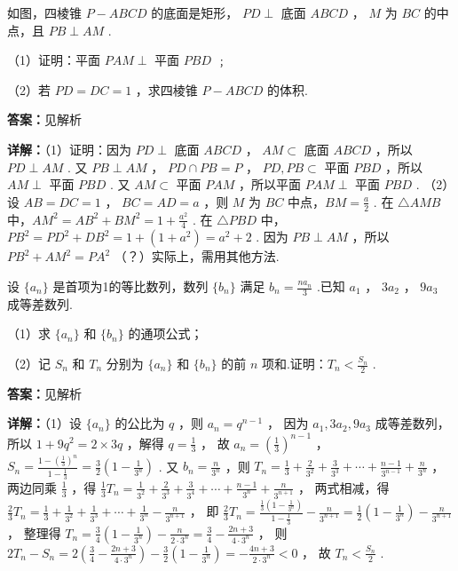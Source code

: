 \begin{question}[points=12]
如图，四棱锥 $P-ABCD$ 的底面是矩形， $PD \perp$ 底面 $ABCD$ ， $M$ 为 $BC$ 的中点，且 $PB \perp AM$ .

（1）证明：平面 $PAM \perp$ 平面 $PBD$ ﹔

（2）若 $PD = DC = 1$ ，求四棱锥 $P-ABCD$ 的体积.
\begin{solution}
\textbf{答案：}见解析

\textbf{详解：}（1）证明：因为 $PD \perp$ 底面 $ABCD$ ， $AM \subset$ 底面 $ABCD$ ，所以 $PD \perp AM$ .
又 $PB \perp AM$ ， $PD \cap PB = P$ ， $PD, PB \subset$ 平面 $PBD$ ，所以 $AM \perp$ 平面 $PBD$ .
又 $AM \subset$ 平面 $PAM$ ，所以平面 $PAM \perp$ 平面 $PBD$ .
（2）设 $AB = DC = 1$ ， $BC = AD = a$ ，则 $M$ 为 $BC$ 中点，$BM = \frac{a}{2}$ .
在 $\triangle AMB$ 中，$AM^2 = AB^2 + BM^2 = 1 + \frac{a^2}{4}$ .
在 $\triangle PBD$ 中，$PB^2 = PD^2 + DB^2 = 1 + (1+a^2) = a^2+2$ .
因为 $PB \perp AM$ ，所以 $PB^2 + AM^2 = PA^2$ （？）实际上，需用其他方法.
\end{solution}
\end{question}

\begin{question}[points=12]
设 $\{a_n\}$ 是首项为1的等比数列，数列 $\{b_n\}$ 满足 $b_n = \frac{na_n}{3}$ .已知 $a_1$ ， $3a_2$ ， $9a_3$ 成等差数列.

（1）求 $\{a_n\}$ 和 $\{b_n\}$ 的通项公式；

（2）记 $S_n$ 和 $T_n$ 分别为 $\{a_n\}$ 和 $\{b_n\}$ 的前 $n$ 项和.证明：$T_n < \frac{S_n}{2}$ .
\begin{solution}
\textbf{答案：}见解析

\textbf{详解：}（1）设 $\{a_n\}$ 的公比为 $q$ ，则 $a_n = q^{n-1}$ ，
因为 $a_1, 3a_2, 9a_3$ 成等差数列，所以 $1 + 9q^2 = 2\times 3q$ ，解得 $q = \frac{1}{3}$ ，
故 $a_n = \left(\frac{1}{3}\right)^{n-1}$ ， $S_n = \frac{1-\left(\frac{1}{3}\right)^n}{1-\frac{1}{3}} = \frac{3}{2}\left(1-\frac{1}{3^n}\right)$ .
又 $b_n = \frac{n}{3^n}$ ，则 $T_n = \frac{1}{3} + \frac{2}{3^2} + \frac{3}{3^3} + \cdots + \frac{n-1}{3^{n-1}} + \frac{n}{3^n}$ ，
两边同乘 $\frac{1}{3}$ ，得 $\frac{1}{3}T_n = \frac{1}{3^2} + \frac{2}{3^3} + \frac{3}{3^4} + \cdots + \frac{n-1}{3^n} + \frac{n}{3^{n+1}}$ ，
两式相减，得 $\frac{2}{3}T_n = \frac{1}{3} + \frac{1}{3^2} + \frac{1}{3^3} + \cdots + \frac{1}{3^n} - \frac{n}{3^{n+1}}$ ，
即 $\frac{2}{3}T_n = \frac{\frac{1}{3}(1-\frac{1}{3^n})}{1-\frac{1}{3}} - \frac{n}{3^{n+1}} = \frac{1}{2}(1-\frac{1}{3^n}) - \frac{n}{3^{n+1}}$ ，
整理得 $T_n = \frac{3}{4}(1-\frac{1}{3^n}) - \frac{n}{2\cdot3^n} = \frac{3}{4} - \frac{2n+3}{4\cdot3^n}$ ，
则 $2T_n - S_n = 2\left(\frac{3}{4} - \frac{2n+3}{4\cdot3^n}\right) - \frac{3}{2}\left(1-\frac{1}{3^n}\right) = -\frac{4n+3}{2\cdot3^n} < 0$ ，
故 $T_n < \frac{S_n}{2}$ .
\end{solution}
\end{question}

